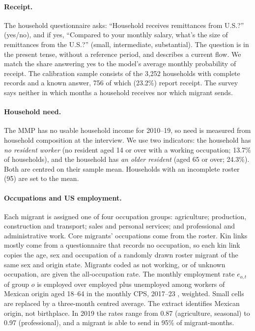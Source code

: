 \paragraph{Receipt.} The household questionnaire asks: ``Household receives remittances from U.S.?'' (yes/no), and if yes, ``Compared to your monthly salary, what's the size of remittances from the U.S.?'' (small, intermediate, substantial). The question is in the present tense, without a reference period, and describes a current flow. We match the share answering yes to the model's average monthly probability of receipt. The calibration sample consists of the 3,252 households with complete records and a known answer, 756 of which (23.2\%) report receipt. The survey says neither in which months a household receives nor which migrant sends.

\paragraph{Household need.} The MMP has no usable household income for 2010--19, so need is measured from household composition at the interview. We use two indicators: the household has \emph{no resident worker} (no resident aged 14 or over with a working occupation; 13.7\% of households), and the household has \emph{an older resident} (aged 65 or over; 24.3\%). Both are centred on their sample mean. Households with an incomplete roster (95) are set to the mean.

\paragraph{Occupations and US employment.} Each migrant is assigned one of four occupation groups: agriculture; production, construction and transport; sales and personal services; and professional and administrative work. Core migrants' occupations come from the roster. Kin links mostly come from a questionnaire that records no occupation, so each kin link copies the age, sex and occupation of a randomly drawn roster migrant of the same sex and origin state. Migrants coded as not working, or of unknown occupation, are given the all-occupation rate. The monthly employment rate $e_{o,t}$ of group $o$ is employed over employed plus unemployed among workers of Mexican origin aged 18--64 in the monthly CPS, 2017--23 \citep{ipumscps}, weighted. Small cells are replaced by a three-month centred average. The extract identifies Mexican origin, not birthplace. In 2019 the rates range from 0.87 (agriculture, seasonal) to 0.97 (professional), and a migrant is able to send in 95\% of migrant-months.


